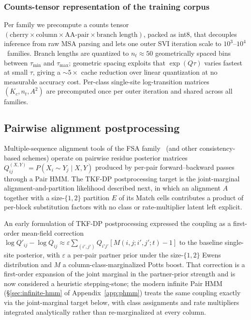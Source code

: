 \subsubsection*{Counts-tensor representation of the training corpus}

Per family we precompute a counts tensor
$(\text{cherry} \times \text{column} \times \text{AA-pair} \times \text{branch length})$,
packed as int8, that decouples inference from raw MSA parsing and
lets one outer SVI iteration scale to $10^3$--$10^4$ \Pfam\ families.
Branch lengths are quantized to $n_t \approx 50$ geometrically spaced
bins between $\tau_{\min}$ and $\tau_{\max}$; geometric spacing
exploits that $\exp(Q\tau)$ varies fastest at small $\tau$, giving a
$\sim 5\times$ cache reduction over linear quantization at no
measurable accuracy cost. Per-class single-site log-transition
matrices $(K_c, n_t, A^2)$ are precomputed once per outer iteration
and shared across all families.

\subsection{Pairwise alignment postprocessing}
\label{sec:postprocessing}

Multiple-sequence alignment tools of the FSA
family~\citep{bradley2009fsa} (and other consistency-based schemes)
operate on pairwise residue posterior matrices
$Q^{(X, Y)}_{ij} = P(X_i \sim Y_j \mid X, Y)$ produced by per-pair
forward--backward passes through a Pair HMM. The TKF-DP postprocessing
target is the joint-marginal alignment-and-partition likelihood
described next, in which an alignment $A$ together with a
size-$\{1, 2\}$ partition $E$ of its Match cells contributes a
product of per-block substitution factors with no class or
rate-multiplier latent left explicit.

\begin{remark}
\label{rem:deprecated-mean-field}
An early formulation of TKF-DP postprocessing expressed the
coupling as a first-order mean-field correction
$\log Q'_{ij} - \log Q_{ij} \approx \varepsilon \sum_{(i', j')}
  Q_{i' j'} [M(i, j; i', j'; t) - 1]$
to the baseline single-site posterior, with $\varepsilon$ a
per-pair partner prior under the size-$\{1, 2\}$ Ewens
distribution and $M$ a column-class-marginalized Potts boost. That
correction is a first-order expansion of the joint marginal in
the partner-prior strength and is now considered a heuristic
stepping-stone; the modern infinite Pair HMM
(\S\ref{sec:infinite-hmm} of Appendix~\ref{app:phmm}) treats the
same coupling exactly via the joint-marginal target below, with
class assignments and rate multipliers integrated analytically
rather than re-marginalized at every column.
\end{remark}

